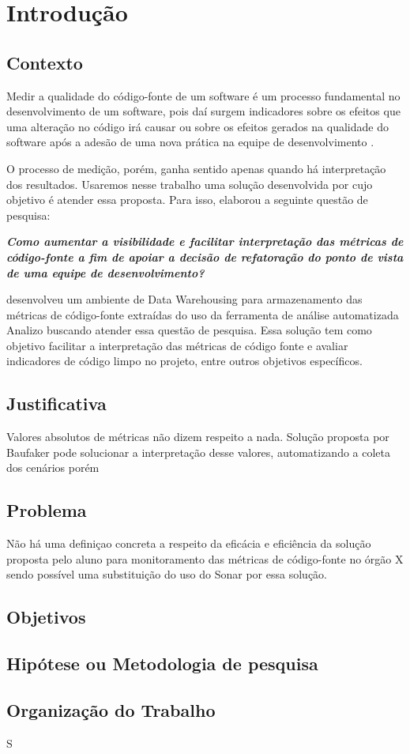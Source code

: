 \chapter{Introdução}

\section{Contexto}

Medir a qualidade do código-fonte  de um software é um processo fundamental no desenvolvimento de um software, pois daí surgem indicadores sobre os efeitos que uma alteração no código irá causar ou sobre os efeitos gerados na qualidade do software após a adesão de uma nova prática na equipe de desenvolvimento \cite{Fenton98}.

O processo de medição, porém, ganha sentido apenas quando há interpretação dos resultados. Usaremos nesse trabalho uma solução desenvolvida por  cujo objetivo é atender essa proposta. Para isso,  elaborou a seguinte questão de pesquisa: 

\textit{\textbf{Como aumentar a
visibilidade e facilitar interpretação das 
métricas de código-fonte
a fim de apoiar a decisão de refatoração
do ponto de vista de uma equipe de desenvolvimento?}}

 desenvolveu um ambiente de Data Warehousing para armazenamento das métricas de código-fonte extraídas do uso da ferramenta de análise  automatizada Analizo buscando atender essa questão de pesquisa. Essa solução tem como objetivo facilitar a interpretação das métricas de código fonte e avaliar indicadores de código limpo no projeto, entre outros objetivos específicos.

\section{Justificativa}

Valores absolutos de métricas não dizem respeito a nada. Solução proposta por Baufaker pode solucionar a interpretação desse valores, automatizando a coleta dos cenários porém

\section{Problema}

Não há uma definiçao concreta a respeito da eficácia e eficiência da solução proposta pelo aluno  para monitoramento das métricas de código-fonte no órgão X sendo possível uma substituição do uso do Sonar por essa solução.


\section{Objetivos}

\section{Hipótese ou Metodologia de pesquisa}

\section{Organização do Trabalho}
S
